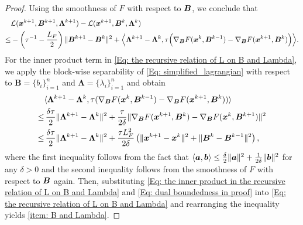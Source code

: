 \begin{proof}
    Using the smoothness of $F$ with respect to $\bm{B}$, we conclude that
    \begin{align}
        \label{Eq: the recursive relation of L on B and Lambda} & \mathcal{L}(\bm{x}^{k+1}, \bm{B}^{k+1}, \bm{\Lambda}^{k+1}) - \mathcal{L}(\bm{x}^{k+1}, \bm{B}^{k}, \bm{\Lambda}^{k}) \notag                                                                                                                        \\
        \leq                                                    & - \left(\tau^{-1}- \frac{L_{F}}{2}\right) \|\bm{B}^{k+1}- \bm{B}^{k}\|^{2}+ \Big\langle \bm{\Lambda}^{k+1}- \bm{\Lambda}^{k}, \tau \Big( \nabla_{\bm{B}}F(\bm{x}^{k}, \bm{B}^{k-1}) - \nabla_{\bm{B}}F(\bm{x}^{k+1}, \bm{B}^{k}) \Big) \Big\rangle.
    \end{align}
    For the inner product term in \eqref{Eq: the recursive relation of L on B and Lambda},
    we apply the block-wise separability of \eqref{Eq: simplified_lagrangian}
    with respect to $\bm{B}= \{b_{i}\}_{i=1}^{n}$ and
    $\bm{\Lambda}= \{\lambda_{i}\}_{i=1}^{n}$ and obtain
    \begin{align}
        \label{Eq: the inner product in the recursive relation of L on B and Lambda} & \langle \bm{\Lambda}^{k+1}- \bm{\Lambda}^{k}, \tau (\nabla_{\bm{B}}F(\bm{x}^{k}, \bm{B}^{k-1}) - \nabla_{\bm{B}}F(\bm{x}^{k+1}, \bm{B}^{k})) \rangle \notag                                       \\
        \leq                                                                         & \, \frac{\delta\tau}{2}\|\bm{\Lambda}^{k+1}- \bm{\Lambda}^{k}\|^{2}+ \frac{\tau}{2\delta}\|\nabla_{\bm{B}}F(\bm{x}^{k+1}, \bm{B}^{k}) - \nabla_{\bm{B}}F(\bm{x}^{k}, \bm{B}^{k+1}) \|^{2} \notag \\
        \leq                                                                         & \, \frac{\delta\tau}{2}\|\bm{\Lambda}^{k+1}- \bm{\Lambda}^{k}\|^{2}+ \frac{\tau L_{F}^{2}}{2\delta}\left( \|\bm{x}^{k+1}- \bm{x}^{k}\|^{2}+ \|\bm{B}^{k}- \bm{B}^{k-1}\|^{2}\right),
    \end{align}
    where the first inequality follows from the fact that
    $\left<\bm{a}, \bm{b}\right> \leq \frac{\delta}{2}\|\bm{a}\|^{2}+ \frac{1}{2\delta}\|
    \bm{b}\|^{2}$ for any $\delta >0$ and the second inequality follows from the smoothness of $F$ with respect to $\bm{B}$ again. Then, substituting \eqref{Eq: the inner product in the recursive relation of L on B and Lambda}
    and \eqref{Eq: dual boundedness in proof} into \eqref{Eq: the recursive relation of L on B and Lambda}
    and rearranging the inequality yields \eqref{item: B and Lambda}. 
\end{proof}

